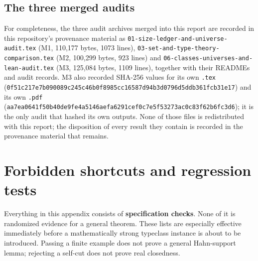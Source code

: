 \documentclass[11pt,letterpaper]{article}
\numberwithin{equation}{section}
\theoremstyle{definition}
\theoremstyle{remark}
\begin{document}
\subsection*{The three merged audits}
For completeness, the three audit archives merged into this report are recorded
in this repository's provenance material as
\texttt{01-size-ledger-and-universe-audit.tex} (M1, 110{,}177 bytes, 1073
lines), \texttt{03-set-and-type-theory-comparison.tex} (M2, 100{,}299 bytes, 923
lines) and \texttt{06-classes-universes-and-lean-audit.tex} (M3, 125{,}084
bytes, 1109 lines), together with their READMEs and audit records. M3 also
recorded SHA-256 values for its own \texttt{.tex}
(\texttt{0f51c217e7b090089c245c46b0f8985cc16587d94b3d0796d5ddb361fcb31e17}) and
its own \texttt{.pdf}
(\texttt{aa7ea0641f50b40de9fe4a5146aefa6291cef0c7e5f53273ac0c83f62b6fc3d6}); it
is the only audit that hashed its own outputs. None of those files is
redistributed with this report; the disposition of every result they contain is
recorded in the provenance material that remains.

\section{Forbidden shortcuts and regression tests}
\label{found:app:shortcuts}

Everything in this appendix consists of \textbf{specification checks}. None of
it is randomized evidence for a general theorem. These lists are especially
effective immediately before a mathematically strong typeclass instance is about
to be introduced. Passing a finite example does not prove a general Hahn-support
lemma; rejecting a self-cut does not prove real closedness.
\end{document}
